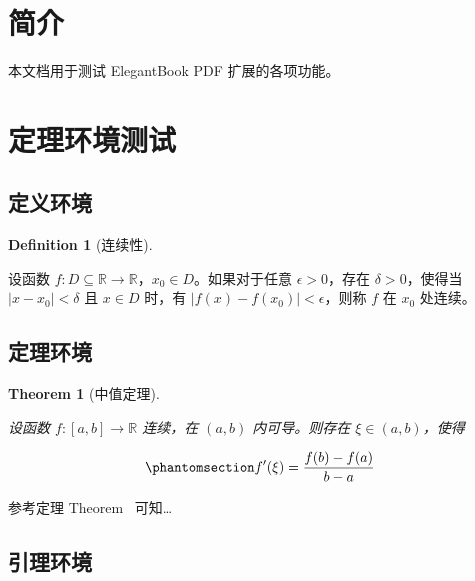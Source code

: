 \documentclass[
  11pt,
  letterpaper,
  oneside,
  a4paper]{book}
\numberwithin{equation}{chapter}
\let\quartoOldRef\ref
\renewcommand{\ref}[1]{%
    \IfBeginWith{#1}{eq-}{%
      \textup{(\quartoOldRef{#1})}%
    }{%
      \quartoOldRef{#1}%
    }%
  }%
\theoremstyle{plain}
\theoremstyle{definition}
\newtheorem{definition}{Definition}[chapter]
\theoremstyle{plain}
\theoremstyle{plain}
\theoremstyle{plain}
\newtheorem{theorem}{Theorem}[chapter]
\theoremstyle{remark}
\begin{document}
\section{简介}\label{ux7b80ux4ecb}

本文档用于测试 ElegantBook PDF 扩展的各项功能。

\section{定理环境测试}\label{ux5b9aux7406ux73afux5883ux6d4bux8bd5}

\subsection{定义环境}\label{ux5b9aux4e49ux73afux5883}

\begin{definition}[连续性]\protect\hypertarget{def-continuous}{}\label{def-continuous}

设函数
\(f: D \subseteq \mathbb{R} \to \mathbb{R}\)，\(x_0 \in D\)。如果对于任意
\(\epsilon > 0\)，存在 \(\delta > 0\)，使得当 \(|x - x_0| < \delta\) 且
\(x \in D\) 时，有 \(|f(x) - f(x_0)| < \epsilon\)，则称 \(f\) 在 \(x_0\)
处连续。

\end{definition}

\subsection{定理环境}\label{ux5b9aux7406ux73afux5883}

\begin{theorem}[中值定理]\protect\hypertarget{thm-mvt}{}\label{thm-mvt}

设函数 \(f: [a,b] \to \mathbb{R}\) 连续，在 \((a,b)\) 内可导。则存在
\(\xi \in (a,b)\)，使得

\begin{equation}\protect\phantomsection\label{eq-einstein}{
f'(\xi) = \frac{f(b) - f(a)}{b - a}
}\end{equation}

\end{theorem}

参考定理 Theorem~\ref{thm-mvt} 可知\ldots{}

\subsection{引理环境}\label{ux5f15ux7406ux73afux5883}
\end{document}
